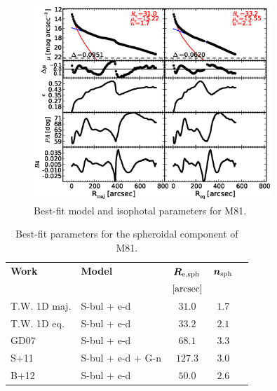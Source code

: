\documentclass[preprint2]{emulateapj}
\newcommand{\fitfigurewidth}{0.8\textwidth}
\begin{document}
  \begin{figure}[h]
  \begin{center}
  \includegraphics[width=\fitfigurewidth]{images/m81_1Dfit.eps}
  \caption{Best-fit model and isophotal parameters for M81.}
  \end{center}
  \end{figure}

  \begin{table}[h]
  \small
  \caption{Best-fit parameters for the spheroidal component of M81.}
  \begin{center}
  \begin{tabular}{llccc}
  \hline
  {\bf Work} & {\bf Model}   & $\bm R_{\rm e,sph}$    & $\bm n_{\rm sph}$ \\
    &  &  $[\rm arcsec]$ & \\
  \hline
  T.W. 1D maj. & S-bul + e-d  & $31.0$  &  $1.7$ \\
  T.W. 1D eq.  & S-bul + e-d  & $33.2$  &  $2.1$ \\
  \hline
  GD07      & S-bul + e-d	 & $68.1$   &  $3.3$ \\
  S+11      & S-bul + e-d + G-n  & $127.3$  &  $3.0$ \\
  B+12      & S-bul + e-d	 & $50.0$   &  $2.6$ \\
  \hline
  \end{tabular}
  \end{center}
  \label{tab:m81}
  \end{table}
\end{document}
